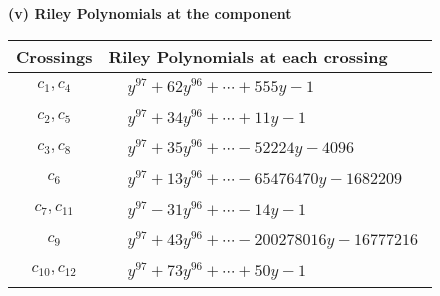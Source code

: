 \documentclass[1p]{elsarticle_modified}
\theoremstyle{definition}
\begin{document}
\flushleft \textbf{(v) Riley Polynomials at the component}\newline \\
\begin{tabular}{m{50pt}|m{274pt}}
Crossings & \hspace{64pt}Riley Polynomials at each crossing \\
\hline $$\begin{aligned}c_{1},c_{4}\end{aligned}$$&$\begin{aligned}
&y^{97}+62 y^{96}+\cdots+555 y-1
\end{aligned}$\\
\hline $$\begin{aligned}c_{2},c_{5}\end{aligned}$$&$\begin{aligned}
&y^{97}+34 y^{96}+\cdots+11 y-1
\end{aligned}$\\
\hline $$\begin{aligned}c_{3},c_{8}\end{aligned}$$&$\begin{aligned}
&y^{97}+35 y^{96}+\cdots-52224 y-4096
\end{aligned}$\\
\hline $$\begin{aligned}c_{6}\end{aligned}$$&$\begin{aligned}
&y^{97}+13 y^{96}+\cdots-65476470 y-1682209
\end{aligned}$\\
\hline $$\begin{aligned}c_{7},c_{11}\end{aligned}$$&$\begin{aligned}
&y^{97}-31 y^{96}+\cdots-14 y-1
\end{aligned}$\\
\hline $$\begin{aligned}c_{9}\end{aligned}$$&$\begin{aligned}
&y^{97}+43 y^{96}+\cdots-200278016 y-16777216
\end{aligned}$\\
\hline $$\begin{aligned}c_{10},c_{12}\end{aligned}$$&$\begin{aligned}
&y^{97}+73 y^{96}+\cdots+50 y-1
\end{aligned}$\\
\hline
\end{tabular}\\~\\
\end{document}
